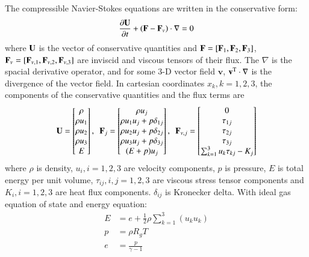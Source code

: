 \documentclass[preprint,12pt]{elsarticle}
\begin{document}
The compressible Navier-Stokes equations are
written in the conservative form:
\begin{equation}
    \label{eq:NS}
    \frac{\partial \mathbf{U}}{\partial t} +
    (\mathbf{F} - \mathbf{F}_v) \cdot \mathbf\nabla = 0
\end{equation}
where $\mathbf{U}$ is the vector of conservative quantities and
$\mathbf{F}=[\mathbf{F}_1,\mathbf{F}_2,\mathbf{F}_3]$,
$\mathbf{F}_v=[\mathbf{F}_{v,1},\mathbf{F}_{v,2},\mathbf{F}_{v,3}]$
are
inviscid and viscous tensors of
their flux.
The $\nabla$ is the spacial derivative operator, and for
some 3-D vector field $\mathbf{v}$, $\mathbf{v}^\mathrm{T} \cdot \nabla$
is the divergence of the vector field.
In cartesian coordinates $x_k, k=1,2,3$, the components of
the conservative quantities and the flux terms are
\begin{equation}
    \mathbf{U} = \begin{bmatrix}
        \rho \\ \rho u_1 \\ \rho u_2 \\ \rho u_3 \\ E
    \end{bmatrix},\ \
    \mathbf{F}_j = \begin{bmatrix}
        \rho u_j                   \\
        \rho u_1u_j + p\delta_{1j} \\
        \rho u_2u_j + p\delta_{2j} \\
        \rho u_3u_j + p\delta_{3j} \\
        (E+p)u_j                   \\
    \end{bmatrix},\ \
    \mathbf{F}_{v,j} = \begin{bmatrix}
        0                                \\
        \tau_{1j}                        \\
        \tau_{2j}                        \\
        \tau_{3j}                        \\
        \sum_{k=1}^3{u_k\tau_{kj}} - K_j \\
    \end{bmatrix}
\end{equation}
where $\rho$ is density,
$u_i, i=1,2,3$ are velocity components,
$p$ is pressure,
$E$ is total energy per unit volume,
$\tau_{ij}, i,j=1,2,3$ are viscous stress tensor components
and
$K_i, i=1,2,3$ are heat flux components.
$\delta_{ij}$ is
Kronecker delta.
With ideal gas equation of state and energy equation:
\begin{equation}
    \begin{aligned}
        E & = e + \frac{1}{2}\rho\sum_{k=1}^{3}(u_ku_k) \\
        p & =\rho R_g T                                 \\
        e & = \frac{p}{\gamma - 1}
    \end{aligned}
\end{equation}
\end{document}
